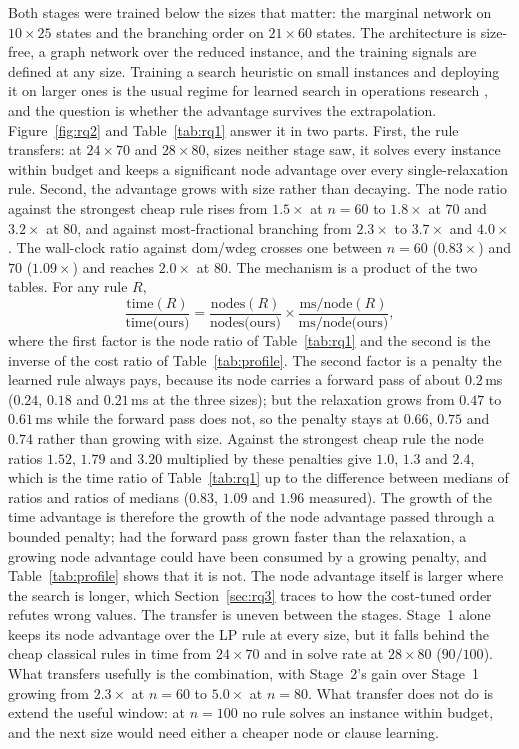\documentclass[final,5p,times,twocolumn,authoryear]{elsarticle}
\begin{document}
Both stages were trained below the sizes that matter: the marginal network on $10\times25$ states and the branching order on $21\times60$ states. The architecture is size-free, a graph network over the reduced instance, and the training signals are defined at any size. Training a search heuristic on small instances and deploying it on larger ones is the usual regime for learned search in operations research \citep{hottung2020deep,yan2025generic}, and the question is whether the advantage survives the extrapolation. Figure~\ref{fig:rq2} and Table~\ref{tab:rq1} answer it in two parts. First, the rule transfers: at $24\times70$ and $28\times80$, sizes neither stage saw, it solves every instance within budget and keeps a significant node advantage over every single-relaxation rule. Second, the advantage grows with size rather than decaying. The node ratio against the strongest cheap rule rises from $1.5\times$ at $n=60$ to $1.8\times$ at $70$ and $3.2\times$ at $80$, and against most-fractional branching from $2.3\times$ to $3.7\times$ and $4.0\times$. The wall-clock ratio against dom/wdeg crosses one between $n=60$ ($0.83\times$) and $70$ ($1.09\times$) and reaches $2.0\times$ at $80$. The mechanism is a product of the two tables. For any rule $R$,
\begin{equation}
\frac{\text{time}(R)}{\text{time(ours)}}=\frac{\text{nodes}(R)}{\text{nodes(ours)}}\times\frac{\text{ms/node}(R)}{\text{ms/node(ours)}},
\label{eq:decomp}
\end{equation}
where the first factor is the node ratio of Table~\ref{tab:rq1} and the second is the inverse of the cost ratio of Table~\ref{tab:profile}. The second factor is a penalty the learned rule always pays, because its node carries a forward pass of about $0.2$\,ms ($0.24$, $0.18$ and $0.21$\,ms at the three sizes); but the relaxation grows from $0.47$ to $0.61$\,ms while the forward pass does not, so the penalty stays at $0.66$, $0.75$ and $0.74$ rather than growing with size. Against the strongest cheap rule the node ratios $1.52$, $1.79$ and $3.20$ multiplied by these penalties give $1.0$, $1.3$ and $2.4$, which is the time ratio of Table~\ref{tab:rq1} up to the difference between medians of ratios and ratios of medians ($0.83$, $1.09$ and $1.96$ measured). The growth of the time advantage is therefore the growth of the node advantage passed through a bounded penalty; had the forward pass grown faster than the relaxation, a growing node advantage could have been consumed by a growing penalty, and Table~\ref{tab:profile} shows that it is not. The node advantage itself is larger where the search is longer, which Section~\ref{sec:rq3} traces to how the cost-tuned order refutes wrong values. The transfer is uneven between the stages. Stage~1 alone keeps its node advantage over the LP rule at every size, but it falls behind the cheap classical rules in time from $24\times70$ and in solve rate at $28\times80$ ($90/100$). What transfers usefully is the combination, with Stage~2's gain over Stage~1 growing from $2.3\times$ at $n=60$ to $5.0\times$ at $n=80$. What transfer does not do is extend the useful window: at $n=100$ no rule solves an instance within budget, and the next size would need either a cheaper node or clause learning.
\end{document}

